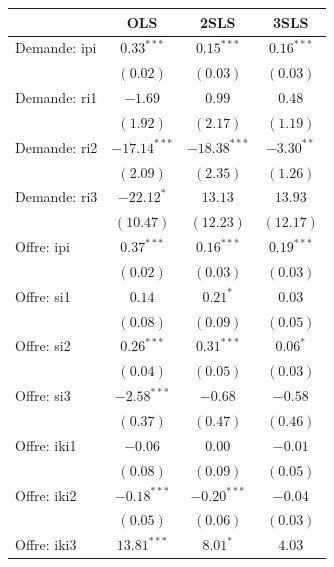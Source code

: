 \documentclass[11pt,]{article}
\begin{document}
\begin{table}[!htbp]
\begin{center}
\begin{tabular}{l c c c }
\hline
 & OLS & 2SLS & 3SLS \\
\hline
Demande: ipi        & $0.33^{***}$   & $0.15^{***}$   & $0.16^{***}$ \\
                    & $(0.02)$       & $(0.03)$       & $(0.03)$     \\
Demande: ri1        & $-1.69$        & $0.99$         & $0.48$       \\
                    & $(1.92)$       & $(2.17)$       & $(1.19)$     \\
Demande: ri2        & $-17.14^{***}$ & $-18.38^{***}$ & $-3.30^{**}$ \\
                    & $(2.09)$       & $(2.35)$       & $(1.26)$     \\
Demande: ri3        & $-22.12^{*}$   & $13.13$        & $13.93$      \\
                    & $(10.47)$      & $(12.23)$      & $(12.17)$    \\
Offre: ipi          & $0.37^{***}$   & $0.16^{***}$   & $0.19^{***}$ \\
                    & $(0.02)$       & $(0.03)$       & $(0.03)$     \\
Offre: si1          & $0.14$         & $0.21^{*}$     & $0.03$       \\
                    & $(0.08)$       & $(0.09)$       & $(0.05)$     \\
Offre: si2          & $0.26^{***}$   & $0.31^{***}$   & $0.06^{*}$   \\
                    & $(0.04)$       & $(0.05)$       & $(0.03)$     \\
Offre: si3          & $-2.58^{***}$  & $-0.68$        & $-0.58$      \\
                    & $(0.37)$       & $(0.47)$       & $(0.46)$     \\
Offre: iki1         & $-0.06$        & $0.00$         & $-0.01$      \\
                    & $(0.08)$       & $(0.09)$       & $(0.05)$     \\
Offre: iki2         & $-0.18^{***}$  & $-0.20^{***}$  & $-0.04$      \\
                    & $(0.05)$       & $(0.06)$       & $(0.03)$     \\
Offre: iki3         & $13.81^{***}$  & $8.01^{*}$     & $4.03$       \\

\end{tabular}
\end{center}
\end{table}
\end{document}
